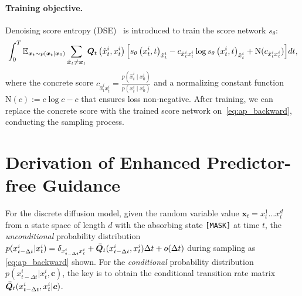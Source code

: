 \paragraph{Training objective.~~\xspace}
Denoising score entropy (DSE)~\cite{SEDD:conf/icml/LouME24} is introduced to train the score network $s_\theta$:
\begin{equation}
\begin{aligned}
       \int_0^T \mathbb{E}_{\bm{x}_t \sim p\left(\bm{x}_t \mid \bm{x}_0\right)} \sum_{{\hat{\bm{x}}_t} \neq \bm{x}_t} {\bm{Q}}_t\left( \hat{{x}}^i_t,{x}^i_t\right)  \Big[s_\theta\left({x}^i_t, t\right)_{\hat{{x}}^i_t}  
        - c_{\hat{{x}}^i_t {x}^i_t} \log s_\theta\left({x}^i_t, t\right)_{\hat{{x}}^i_t}+  \text{N}(c_{\hat{{x}}^i_t {x}^i_t})\Big] dt ,
\end{aligned}
\label{eq:ap_score_entropy}
\end{equation}
where the concrete score $c_{\hat{{x}}^i_t {x}^i_t} = \frac{p\left({\hat{{x}}^i_t} \mid {x}^i_0\right)}{p\left({x}^i_t \mid {x}^i_0\right)}$ and a normalizing constant function $\text{N}(c):= c \log c - c$ that ensures loss non-negative.
After training, we can replace the concrete score with the trained score network on~\cref{eq:ap_backward}, conducting the sampling process.


\section{Derivation of Enhanced Predictor-free Guidance}
\label{sec:pfg}
For the discrete diffusion model, given the random variable value $\bm{x}_t=x^1_t \ldots x^d_t$ from a state space of length $d$ with the absorbing state \texttt{[MASK]} at time $t$, the \textit{unconditional} probability distribution $p({x}^i_{t- \Delta t}|x^i_t) = \delta_{{x}^i_{t- \Delta t}x^i_t} + \bar{{\bm{Q}}}_t({x}^i_{t- \Delta t},x^i_t)\Delta t + o(\Delta t)$ during sampling as \cref{eq:ap_backward} shown. For the \textit{conditional} probability distribution $p({x}^i_{t- \Delta t}|x^i_t, \bm{c})$, the key is to obtain the conditional transition rate matrix $\bar{{\bm{Q}}}_t({x}^i_{t- \Delta t},x^i_t|\bm{c})$. 

